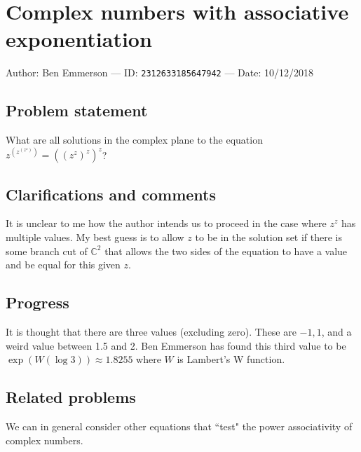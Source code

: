 
\section{Complex numbers with associative exponentiation}

Author: Ben Emmerson --- ID: \verb`2312633185647942` --- Date: 10/12/2018

\subsection{Problem statement}

What are all solutions in the complex plane to the equation $z^{(z^{(z^z)})}=((z^z)^z)^z$?

\subsection{Clarifications and comments}

It is unclear to me how the author intends us to proceed in the case where $z^z$ has multiple values. My best guess is to allow $z$ to be in the solution set if there is some branch cut of $\mathbb{C}^2$ that allows the two sides of the equation to have a value and be equal for this given $z$.

\subsection{Progress}

It is thought that there are three values (excluding zero). These are $-1, 1$, and a weird value between 1.5 and 2. Ben Emmerson has found this third value to be $\exp(W(\log 3))\approx 1.8255$ where $W$ is Lambert's W function.

\subsection{Related problems}

We can in general consider other equations that ``test" the power associativity of complex numbers.

